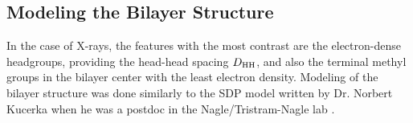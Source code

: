 %

\newpage
\subsection{Modeling the Bilayer Structure}\label{sec:SDP_method}
In the case of X-rays, the features with the most contrast are the 
electron-dense headgroups, providing the head-head spacing $D_\textrm{HH}$,
and also the terminal methyl groups in the bilayer center with the least 
electron density.
Modeling of the bilayer structure was done similarly to the SDP model 
written by Dr. Norbert Kucerka when he was a postdoc in the 
Nagle/Tristram-Nagle lab \cite{Kucerka08}. 

